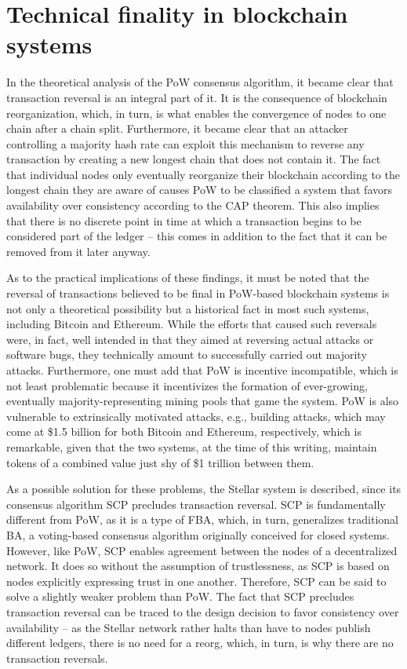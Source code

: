 \section{Technical finality in blockchain systems}

In the theoretical analysis of the PoW consensus algorithm, it became clear that transaction reversal is an integral part of it.
It is the consequence of blockchain reorganization, which, in turn, is what enables the convergence of nodes to one chain after a chain split.
Furthermore, it became clear that an attacker controlling a majority hash rate can exploit this mechanism to reverse any transaction by creating a new longest chain that does not contain it.
The fact that individual nodes only eventually reorganize their blockchain according to the longest chain they are aware of causes PoW to be classified a system that favors availability over consistency according to the CAP theorem.
This also implies that there is no discrete point in time at which a transaction begins to be considered part of the ledger -- this comes in addition to the fact that it can be removed from it later anyway.

As to the practical implications of these findings, it must be noted that the reversal of transactions believed to be final in PoW-based blockchain systems is not only a theoretical possibility but a historical fact in most such systems, including Bitcoin and Ethereum.
While the efforts that caused such reversals were, in fact, well intended in that they aimed at reversing actual attacks or software bugs, they technically amount to successfully carried out majority attacks.
Furthermore, one must add that PoW is incentive incompatible, which is not least problematic because it incentivizes the formation of ever-growing, eventually majority-representing mining pools that game the system.
PoW is also vulnerable to extrinsically motivated attacks, e.g., building attacks, which may come at \$1.5 billion for both Bitcoin and Ethereum, respectively, which is remarkable, given that the two systems, at the time of this writing, maintain tokens of a combined value just shy of \$1 trillion between them.

As a possible solution for these problems, the Stellar system is described, since its consensus algorithm SCP precludes transaction reversal.
SCP is fundamentally different from PoW, as it is a type of FBA, which, in turn, generalizes traditional BA, a voting-based consensus algorithm originally conceived for closed systems.
However, like PoW, SCP enables agreement between the nodes of a decentralized network.
It does so without the assumption of trustlessness, as SCP is based on nodes explicitly expressing trust in one another.
Therefore, SCP can be said to solve a slightly weaker problem than PoW.
The fact that SCP precludes transaction reversal can be traced to the design decision to favor consistency over availability -- as the Stellar network rather halts than have to nodes publish different ledgers, there is no need for a reorg, which, in turn, is why there are no transaction reversals.

